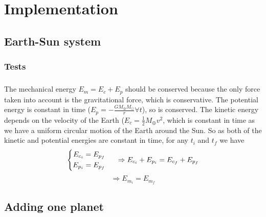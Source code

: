 \documentclass[a4paper, twoside, 11pt]{report}
\theoremstyle{theorem}
\theoremstyle{remark}
\theoremstyle{exemple}
\begin{document}
\chapter{Implementation}

    \section{Earth-Sun system}
        \subsection{}
        
        \subsection{Tests}
            \paragraph{}The mechanical energy $E_m = E_c + E_p$ should be conserved because the only force taken into account is the gravitational force, which is conservative. The potential energy is constant in time ($E_p = -\frac{GM_{\oplus}M_{\odot}}{r} \forall t$), so is conserved. The kinetic energy depends on the velocity of the Earth ($E_c = \frac{1}{2}M_{\oplus}v^2$, which is constant in time as we have a uniform circular motion of the Earth around the Sun. So as both of the kinetic and potential energies are constant in time, for any $t_i$ and $t_f$ we have
                \begin{equation*}
                    \left\{
                        \begin{aligned}
                            E_{c_i} &= E_{p_f}\\
                            E_{p_i} &= E_{p_f}
                        \end{aligned}
                    \right. \hspace{0.5cm} \Rightarrow E_{c_i} + E_{p_i} = E_{c_f} + E_{p_f}
                \end{equation*} 
                \begin{equation*}
                    \Rightarrow E_{m_i} = E_{m_f}
                \end{equation*}
                        
    
    \section{Adding one planet}
    
\end{document}
